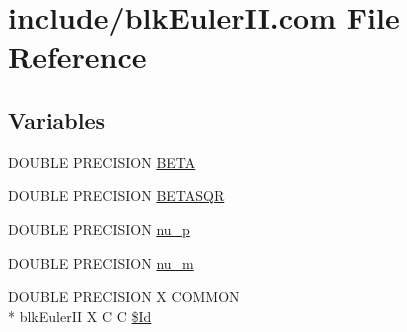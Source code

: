 \hypertarget{blk_euler_i_i_8com}{\section{include/blk\-Euler\-I\-I.com File Reference}
\label{blk_euler_i_i_8com}
}
\subsection*{Variables}
\begin{DoxyCompactItemize}
\item 
D\-O\-U\-B\-L\-E P\-R\-E\-C\-I\-S\-I\-O\-N \hyperlink{blk_euler_i_i_8com_a41ef0ad0ee32dac89987c7180349fc65}{B\-E\-T\-A}
\item 
D\-O\-U\-B\-L\-E P\-R\-E\-C\-I\-S\-I\-O\-N \hyperlink{blk_euler_i_i_8com_ac0146ab866702996a794cadecf77eb99}{B\-E\-T\-A\-S\-Q\-R}
\item 
D\-O\-U\-B\-L\-E P\-R\-E\-C\-I\-S\-I\-O\-N \hyperlink{blk_euler_i_i_8com_ab283911b22384fef633cd41d154f3f2f}{nu\-\_\-p}
\item 
D\-O\-U\-B\-L\-E P\-R\-E\-C\-I\-S\-I\-O\-N \hyperlink{blk_euler_i_i_8com_a98e43f19d876d2049e78b89adbf5a71d}{nu\-\_\-m}
\item 
D\-O\-U\-B\-L\-E P\-R\-E\-C\-I\-S\-I\-O\-N X C\-O\-M\-M\-O\-N \\*
blk\-Euler\-I\-I X C C \hyperlink{blk_euler_i_i_8com_aee39e63378026ca0f2ad3d2269ba8617}{\$\-Id}
\end{DoxyCompactItemize}


